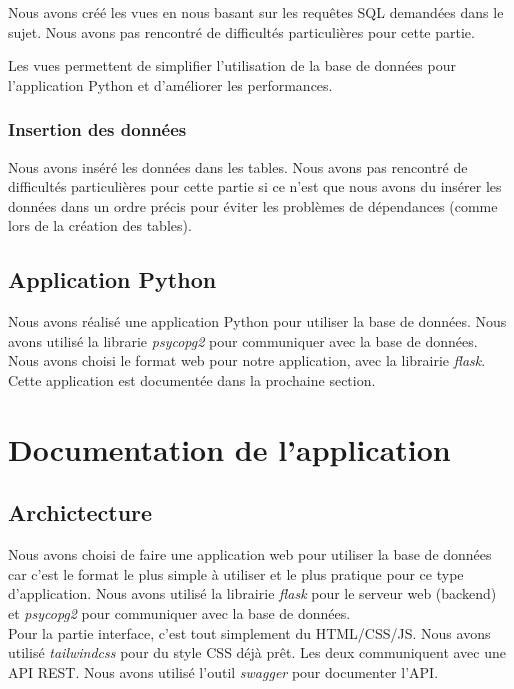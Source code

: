 \documentclass{report-UTC}
\begin{document}
Nous avons créé les vues en nous basant sur les requêtes SQL demandées dans le
sujet. Nous avons pas rencontré de difficultés particulières pour cette partie.

Les vues permettent de simplifier l'utilisation de la base de données pour
l'application Python et d'améliorer les performances.

\subsubsection{Insertion des données}

Nous avons inséré les données dans les tables. Nous avons pas rencontré de
difficultés particulières pour cette partie si ce n'est que nous avons du
insérer les données dans un ordre précis pour éviter les problèmes de
dépendances (comme lors de la création des tables).

\subsection{Application Python}

Nous avons réalisé une application Python pour utiliser la base de données.
Nous avons utilisé la librarie \textit{psycopg2} pour communiquer avec la base
de données. Nous avons choisi le format web pour notre application, avec la 
librairie \textit{flask}. Cette application est documentée dans la prochaine 
section.    

\section{Documentation de l'application}
\subsection{Archictecture}

Nous avons choisi de faire une application web pour utiliser la base de données
car c'est le format le plus simple à utiliser et le plus pratique pour ce type
d'application. Nous avons utilisé la librairie \textit{flask} pour le serveur
web (backend) et \textit{psycopg2} pour communiquer avec la base de données. \\

Pour la partie interface, c'est tout simplement du HTML/CSS/JS. Nous avons
utilisé \textit{tailwindcss} pour du style CSS déjà prêt. Les deux communiquent
avec une API REST. Nous avons utilisé l'outil \textit{swagger} pour documenter
l'API.
\end{document}
